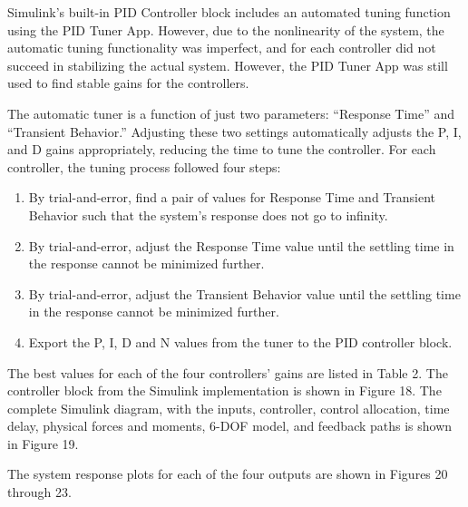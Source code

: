 Simulink's built-in PID Controller block includes an automated tuning function using the PID Tuner App. However, due to the nonlinearity of the system, the automatic tuning functionality was imperfect, and for each controller did not succeed in stabilizing the actual system. However, the PID Tuner App was still used to find stable gains for the controllers.

The automatic tuner is a function of just two parameters: ``Response Time'' and ``Transient Behavior.'' Adjusting these two settings automatically adjusts the P, I, and D gains appropriately, reducing the time to tune the controller. For each controller, the tuning process followed four steps:
\begin{enumerate}
    \item By trial-and-error, find a pair of values for Response Time and Transient Behavior such that the system's response does not go to infinity.
    \item By trial-and-error, adjust the Response Time value until the settling time in the response cannot be minimized further.
    \item By trial-and-error, adjust the Transient Behavior value until the settling time in the response cannot be minimized further.
    \item Export the P, I, D and N values from the tuner to the PID controller block.
\end{enumerate}

The best values for each of the four controllers' gains are listed in Table 2. The controller block from the Simulink implementation is shown in Figure 18. The complete Simulink diagram, with the inputs, controller, control allocation, time delay, physical forces and moments, 6-DOF model, and feedback paths is shown in Figure 19.

The system response plots for each of the four outputs are shown in Figures 20 through 23.